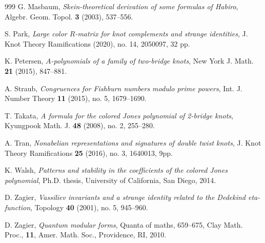 \documentclass[11pt,reqno]{amsart}
\theoremstyle{definition}
\numberwithin{equation}{section}
\begin{document}
\begin{thebibliography}{999}
G. Masbaum, \emph{Skein-theoretical derivation of some formulas of Habiro}, Algebr. Geom. Topol. \textbf{3} (2003), 537--556.

S. Park, \emph{Large color $R$-matrix for knot complements and strange identities}, J. Knot Theory Ramifications  (2020), no. 14, 2050097, 32 pp. 

K. Petersen, \emph{$A$-polynomials of a family of two-bridge knots}, New York J. Math. \textbf{21} (2015), 847--881.

A. Straub, \emph{Congruences for Fishburn numbers modulo prime powers}, Int. J. Number Theory \textbf{11} (2015), no. 5, 1679--1690.

T. Takata, \emph{A formula for the colored Jones polynomial of 2-bridge knots}, Kyungpook Math. J. \textbf{48} (2008), no. 2, 255--280.

A. Tran, \emph{Nonabelian representations and signatures of double twist knots}, J. Knot Theory Ramifications \textbf{25} (2016), no. 3, 1640013, 9pp.

K. Walsh, \emph{Patterns and stability in the coefficients of the colored Jones polynomial}, Ph.D. thesis, University of California, San Diego, 2014.

D. Zagier, \emph{Vassiliev invariants and a strange identity related to the Dedekind eta-function}, Topology {\bf 40} (2001), no. 5, 945--960.

D. Zagier, \emph{Quantum modular forms}, Quanta of maths, 659--675, Clay Math. Proc., \textbf{11}, Amer. Math. Soc., Providence, RI, 2010.



\end{thebibliography}
\end{document}
